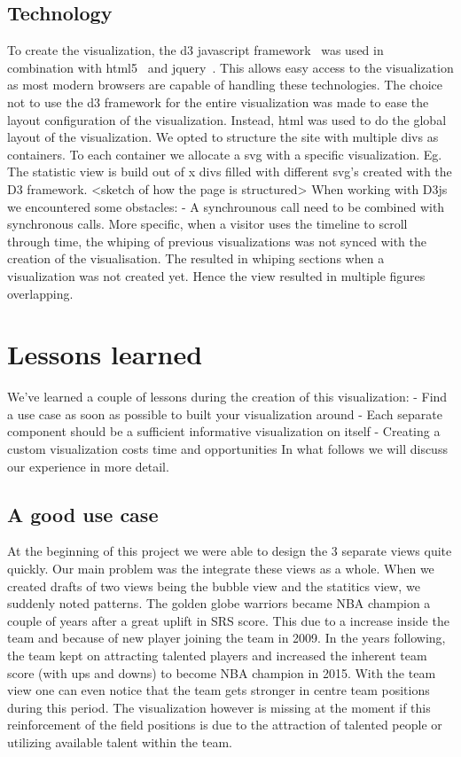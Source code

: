 \documentclass{sigchi}
\begin{document}
\subsection{Technology}
To create the visualization, the d3 javascript framework~\cite{d3} was used in
combination with html5~\cite{html5} and jquery~\cite{jquery}. This allows easy
access to the visualization as most modern browsers are capable of handling
these technologies.
The choice not to use the d3 framework for the entire visualization was made to
ease the layout configuration of the visualization. Instead, html was used to do
the global layout of the visualization. We opted to structure the site with multiple
divs as containers. To each container we allocate a svg with a specific visualization.
Eg. The statistic view is build out of x divs filled with different svg's created
with the D3 framework.
<sketch of how the page is structured>
When working with D3js we encountered some obstacles:
- A synchrounous call need to be combined with synchronous calls. More specific, when a
visitor uses the timeline to scroll through time, the whiping of previous visualizations 
was not synced with the creation of the visualisation. The resulted in whiping sections 
when a visualization was not created yet. Hence the view resulted in multiple figures 
overlapping.


\section{Lessons learned}\label{sec:discussion}
We've learned a couple of lessons during the creation of this visualization:
- Find a use case as soon as possible to built your visualization around
- Each separate component should be a sufficient informative visualization on itself
- Creating a custom visualization costs time and opportunities
In what follows we will discuss our experience in more detail.

\subsection{A good use case}
At the beginning of this project we were able to design the 3 separate views 
quite quickly. Our main problem was the integrate these views as a whole. When we created drafts
of two views being the bubble view and the statitics view, we suddenly noted patterns. The golden
globe warriors became NBA champion a couple of years after a great uplift in SRS score. This 
due to a increase inside the team and because of new player joining the team in 2009. In 
the years following, the team kept on attracting talented players and increased the inherent
team score (with ups and downs) to become NBA champion in 2015. With the team view one can even
notice that the team gets stronger in centre team positions during this period.
The visualization however is missing at the moment if this reinforcement of the field positions
is due to the attraction of talented people or utilizing available talent within the team.
\end{document}
